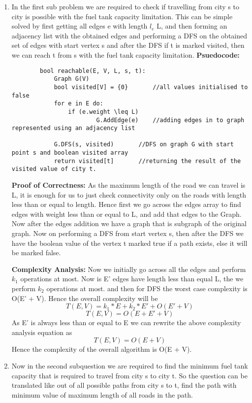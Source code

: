 	\begin{enumerate}
		\item In the first sub problem we are required to check if travelling from city s to city is possible with the fuel tank capacity limitation. This can be simple solved by first getting all edges e with length $l_e$ \leq L, and then forming an adjacency list with the obtained edges and performing a DFS on the obtained set of edges with start vertex s and after the DFS if t is marked visited, then we can reach t from s with the fuel tank capacity limitation.
		\textbf{Psuedocode:}
		\begin{lstlisting}
		bool reachable(E, V, L, s, t):
			Graph G(V)
			bool visited[V] = {0}		//all values initialised to false
			for e in E do:
				if (e.weight \leq L)
		          		G.AddEdge(e)	//adding edges in to graph represented using an adjacency list

			G.DFS(s, visited)		//DFS on graph G with start point s and boolean visited array
			return visited[t]		//returning the result of the visited value of city t.
		\end{lstlisting} 

		\textbf{Proof of Correctness:}
			As the maximum length of the road we can travel is L, it is enough for us to just check connectivity only on the roads with length less than or equal to length. Hence first we go across the edges array to find edges with weight less than or equal to L, and add that edges to the Graph. Now after the edges addition we have a graph that is subgraph of the original graph. Now on performing a DFS from start vertex s, then after the DFS we have the boolean value of the vertex t marked true if a path exists, else it will be marked false.
   
		\textbf{Complexity Analysis:}
			Now we initially go across all the edges and perform $k_1$ operations at most. Now is E' edges have length less than equal L, the we perform $k_2$ operations at most. and then for DFS the worst case complexity is O(E' + V). Hence the overall complexity will be
		\[T(E, V) = k_{1}*E + k_{2}*E' + O(E' + V)\]
		\[T(E, V) = O(E + E' + V)\]
		As E' is always less than or equal to E we can rewrite the above complexity analysis equation as
		\[T(E, V) = O(E + V)\]
			Hence the complexity of the overall algorithm is O(E + V).

		\item Now in the second subquestion we are required to find the minimum fuel tank capacity that is required to travel from city s to city t. So the question can be translated like out of all possible paths from city s to t, find the path with minimum value of maximum length of all roads in the path.
	\end{enumerate}



